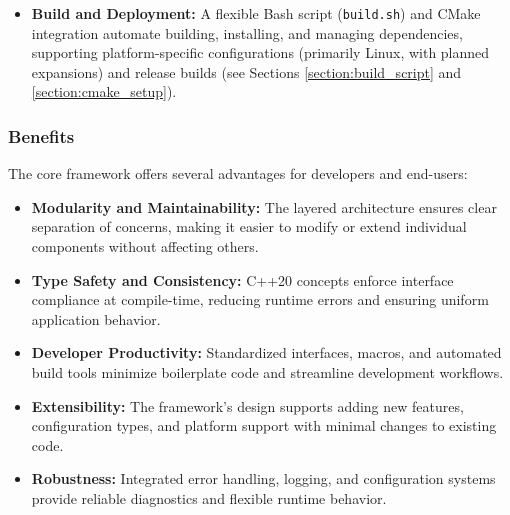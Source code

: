 \begin{itemize}
\begin{itemize}
		\item \textbf{Configuration:} The \texttt{MIAConfig} class supports multiple formats (e.g., key-value, raw lines) with typed accessors and extensible design (see section \ref{section:configuration_system}).
		\item \textbf{Logging:} The \texttt{Logger} class and free functions enable thread-safe logging to customizable files with optional verbose output (see section \ref{section:logging_Framework}).
		\item \textbf{Global Constants and Paths:} The \texttt{constants} and \texttt{paths} namespaces centralize version information and resource locations, adapting to installed or repository-based environments (see Section~\ref{sec:global-constants}).
	\end{itemize}
	\item \textbf{Build and Deployment:} A flexible Bash script (\texttt{build.sh}) and CMake integration automate building, installing, and managing dependencies, supporting platform-specific configurations (primarily Linux, with planned expansions) and release builds (see Sections \ref{section:build_script} and \ref{section:cmake_setup}).
\end{itemize}

\subsubsection{Benefits}
The core framework offers several advantages for developers and end-users:
\begin{itemize}\itemsep0em
	\item \textbf{Modularity and Maintainability:} The layered architecture ensures clear separation of concerns, making it easier to modify or extend individual components without affecting others.
	\item \textbf{Type Safety and Consistency:} C++20 concepts enforce interface compliance at compile-time, reducing runtime errors and ensuring uniform application behavior.
	\item \textbf{Developer Productivity:} Standardized interfaces, macros, and automated build tools minimize boilerplate code and streamline development workflows.
	\item \textbf{Extensibility:} The framework's design supports adding new features, configuration types, and platform support with minimal changes to existing code.
	\item \textbf{Robustness:} Integrated error handling, logging, and configuration systems provide reliable diagnostics and flexible runtime behavior.
\end{itemize}

